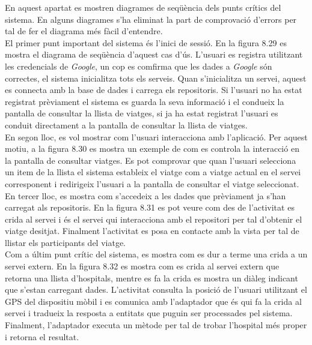 En aquest apartat es mostren diagrames de seqüència dels punts crítics del sistema. En alguns diagrames s'ha eliminat la part de comprovació d'errors per tal de fer el diagrama més fàcil d'entendre.\\

El primer punt important del sistema és l'inici de sessió. En la figura 8.29 es mostra el diagrama de seqüència d'aquest cas d'ús. L'usuari es registra utilitzant les credencials de \textit{Google}, un cop es comfirma que les dades a \textit{Google} són correctes, el sistema inicialitza tots els serveis. Quan s'inicialitza un servei, aquest es connecta amb la base de dades i carrega els repositoris. Si l'usuari no ha estat registrat prèviament el sistema es guarda la seva informació i el condueix la pantalla de consultar la llista de viatges, si ja ha estat registrat l'usuari es conduit directament a la pantalla de consultar la llista de viatges.\\

En segon lloc, es vol mostrar com l'usuari interacciona amb l'aplicació. Per aquest motiu, a la figura 8.30 es mostra un exemple de com es controla la interacció en la pantalla de consultar viatges. Es pot comprovar que quan l'usuari selecciona un item de la llista el sistema estableix el viatge com a viatge actual en el servei corresponent i redirigeix l'usuari a la pantalla de consultar el viatge seleccionat.\\

En tercer lloc, es mostra com s'accedeix a les dades que prèviament ja s'han carregat als repositoris. En la figura 8.31 es pot veure com des de l'activitat es crida al servei i és el servei qui interacciona amb el repositori per tal d'obtenir el viatge desitjat. Finalment l'activitat es posa en contacte amb la vista per tal de llistar els participants del viatge.\\

Com a últim punt crític del sistema, es mostra com es dur a terme una crida a un servei extern. En la figura 8.32 es mostra com es crida al servei extern que retorna una llista d'hospitals, mentre es fa la crida es mostra un diàleg indicant que s'estan carregant dades. L'activitat consulta la posició de l'usuari utilitzant el GPS del dispositiu mòbil i es comunica amb l'adaptador que és qui fa la crida al servei i tradueix la resposta a entitats que puguin ser processades pel sistema. Finalment, l'adaptador executa un mètode per tal de trobar l'hospital més proper i retorna el resultat.

